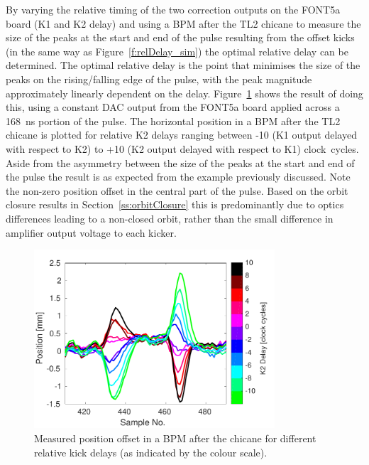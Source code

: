 By varying the relative timing of the two correction outputs on the FONT5a board (K1 and K2 delay) and using a BPM after the TL2 chicane to measure the size of the peaks at the start and end of the pulse resulting from the offset kicks (in the same way as Figure~\ref{f:relDelay_sim}) the optimal relative delay can be determined. The optimal relative delay is the point that minimises the size of the peaks on the rising/falling edge of the pulse, with the peak magnitude  approximately linearly dependent on the delay. Figure~\ref{f:relDelay_traces} shows the result of doing this, using a constant DAC output from the FONT5a board applied across a 168~ns portion of the pulse. The horizontal position in a BPM after the TL2 chicane is plotted for relative K2 delays ranging between -10 (K1 output delayed with respect to K2) to +10 (K2 output delayed with respect to K1) clock~cycles. Aside from the asymmetry between the size of the peaks at the start and end of the pulse the result is as expected from the example previously discussed. Note the non-zero position offset in the central part of the pulse. Based on the orbit closure results in Section~\ref{ss:orbitClosure} this is predominantly due to optics differences leading to a non-closed orbit, rather than the small difference in amplifier output voltage to each kicker.

\begin{figure}
  \centering
  \includegraphics[width=0.8\textwidth]{Figures/commissioning/relDelay_traces}
  \caption{Measured position offset in a BPM after the chicane for different relative kick delays (as indicated by the colour scale).}
  \label{f:relDelay_traces}
\end{figure}

